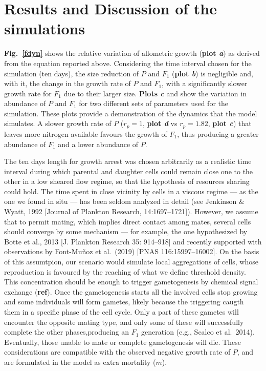 \documentclass[a4paper,oneside]{article}
\begin{document}
  \section*{Results and Discussion of the simulations}
    \textbf{Fig.~\ref{fdyn}} shows the relative variation of allometric growth (\textbf{plot {\color{blue}\textit{a}}}) as derived from the equation reported above.
    Considering the time interval chosen for the simulation (ten days), the size reduction of $P$ and $F_{1}$ (\textbf{plot {\color{blue}\textit{b}}}) is negligible and, with it, the change in the growth rate of $P$ and $F_{1}$, with a significantly slower growth rate for $F_{1}$ due to their larger size.
    \textbf{Plots {\color{blue}\textit{c}}} and {\textbf{}} show the variation in abundance of $P$ and $F_{1}$ for two different sets of parameters used for the simulation.
    These plots provide a demonstration of the dynamics that the model simulates.
    A slower growth rate of $P$ ($r_p=1$, \textbf{plot {\color{blue}\textit{d}}} vs $r_p=1.82$, \textbf{plot {\color{blue}\textit{c}}}) that leaves more nitrogen available favours the growth of $F_{1}$, thus producing a greater abundance of $F_{1}$ and a lower abundance of $P$.

    The ten days length for growth arrest was chosen arbitrarily as a realistic time interval during which parental and daughter cells could remain close one to the other in a low sheared flow regime, so that the hypothesis of resources sharing could hold.
    The time spent in close vicinity by cells in a viscous regime  --- as the one we found in situ --- has been seldom analyzed in detail (see Jenkinson \& Wyatt, 1992 [Journal of Plankton Research, 14:1697--1721]).
    However, we assume that to permit mating, which implies direct contact among mates, several cells should converge by some mechanism --- for example, the one hypothesized by Botte et al., 2013 [J. Plankton Research 35: 914--918] and recently supported with observations by Font-Mu{\~n}oz et al.~(2019) [PNAS 116:15997--16002].
    On the basis of this assumtpion, our scenario would simulate local aggregations of cells, whose reproduction is favoured by the reaching of what we define threshold density.
    This concentration should be enough to trigger gametogenesis by chemical signal exchange ({\color{green}\textbf{ref}}).
    Once the gametogenesis starts all the involved cells stop growing and some individuals will form gametes, likely because the triggering caugth them in a specific phase of the cell cycle.
    Only a part of these gametes will encounter the opposite mating type, and only some of these will successfully complete the other phases,producing an $F_{1}$ generation (e.g., Scalco et al.~2014).
    Eventually, those unable to mate or complete gametogenesis will die.
    These considerations are compatible with the observed negative growth rate of $P$, and are formulated in the model as extra mortality ($m$).
\end{document}
